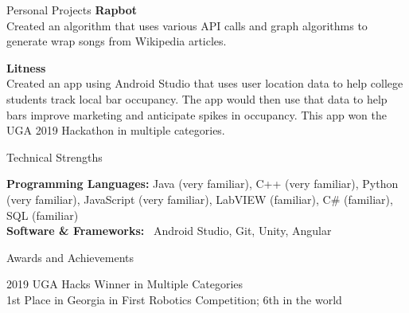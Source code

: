 \documentclass{resume} %
\begin{document}
\begin{rSection}{Personal Projects}
{\bf Rapbot}\\
{ Created an algorithm that uses various API calls and graph algorithms to generate wrap songs from Wikipedia articles. }

{\bf Litness}\\
{ Created an app using Android Studio that uses user location data to help college students track local bar occupancy. The app would then use that data to help bars improve marketing and anticipate spikes in occupancy. This app won the UGA 2019 Hackathon in multiple categories.}

\end{rSection}

\begin{rSection}{Technical Strengths}

{\bf Programming Languages:} Java (very familiar), C++ (very familiar), Python (very familiar), JavaScript (very familiar), LabVIEW (familiar),  C\# (familiar), SQL (familiar) \\
{\bf Software \& Frameworks:} \ Android Studio, Git, Unity, Angular \\

\end{rSection}



\begin{rSection}{Awards and Achievements}

2019 UGA Hacks Winner in Multiple Categories \\
1st Place in Georgia in First Robotics Competition; 6th in the world \\

\end{rSection}
\end{document}

